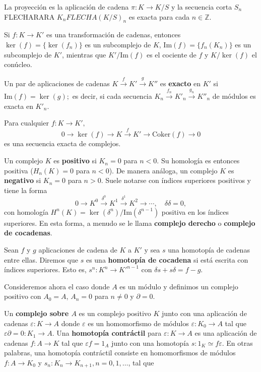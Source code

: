 La proyección es la aplicación de cadena $\pi: K \rightarrow K/S$ y la secuencia corta $S_n$ FLECHARARA $K_n FLECHA (K/S)_n$ es exacta para cada $n \in \mathbb{Z}$.

Si \( f: K \to K' \) es una transformación de cadenas, entonces \( \ker(f) = \{\ker(f_n)\} \) es un subcomplejo de \( K \), \( \text{Im}(f) = \{f_n(K_n)\} \) es un subcomplejo de \( K' \), mientras que \( K'/\text{Im}(f) \) es el cociente de \( f \) y \( K/\ker(f) \) el conúcleo. 

\begin{definicion}
Un par de aplicaciones de cadenas \( K \xrightarrow{f} K' \xrightarrow{g} K'' \) es \textbf{exacto} en \( K' \) si \( \text{Im}(f) = \ker(g); \) es decir, si cada secuencia \( K_n \xrightarrow{f_n} K'_n \xrightarrow{g_n} K''_n \) de módulos es exacta en \( K'_n \).
\end{definicion}

Para cualquier \( f: K \to K', \)
\[ 0 \to \ker(f) \to K \xrightarrow{f} K' \to \text{Coker}(f) \to 0 \]
es una secuencia exacta de complejos.

Un complejo \( K \) es \textbf{positivo} si \( K_n = 0 \) para \( n < 0 \). Su homología es entonces positiva (\( H_n(K) = 0 \) para \( n < 0 \)). De manera análoga, un complejo \( K \) es \textbf{negativo} si \( K_n = 0 \) para \( n > 0 \). Suele notarse con índices superiores positivos y tiene la forma
\[ 0 \to K^0 \xrightarrow{\delta^0} K^1 \xrightarrow{\delta^1} K^2 \to \cdots, \quad \delta\delta = 0, \]
con homología \( H^n(K) = \ker(\delta^n)/\text{Im}(\delta^{n-1}) \) positiva en los índices superiores. En esta forma, a menudo se le llama \textbf{complejo derecho} o \textbf{complejo de cocadenas}.

\begin{definicion}
Sean $f$ y $g$ aplicaciones de cadena de $K$ a $K'$ y sea $s$ una homotopía de cadenas entre ellas. Diremos que $s$ es una \textbf{homotopía de cocadena} si  está escrita con índices superiores. Esto es, \( s^n: K^n \to K'^{n-1} \) con \( \delta s + s \delta = f - g \).
\end{definicion}

Consideremos ahora el caso donde $A$ es un módulo y definimos un complejo positivo con \( A_0 = A \), \( A_n = 0 \) para \( n \neq 0 \) y \( \partial = 0 \).

Un \textbf{complejo sobre \( A \)} es un complejo positivo \( K \) junto con una aplicación de cadenas \( \varepsilon: K \to A \) donde \( \varepsilon \) es un homomorfismo de módulos \( \varepsilon: K_0 \to A \) tal que \( \varepsilon \partial = 0: K_1 \to A \). Una \textbf{homotopía contráctil} para \( \varepsilon: K \to A \) es una aplicación de cadenas \( f: A \to K \) tal que \( \varepsilon f = 1_A \) junto con una homotopía \( s: 1_K \simeq f \varepsilon \). En otras palabras, una homotopía contráctil consiste en homomorfismos de módulos \( f: A \to K_0 \) y \( s_n: K_n \to K_{n+1}, n = 0, 1, \dots \), tal que


